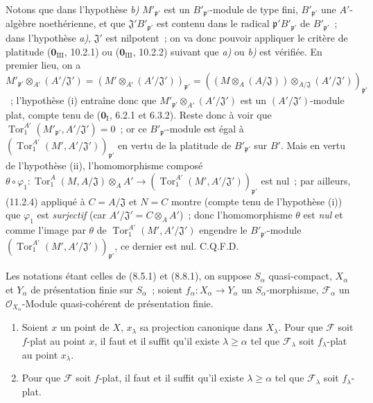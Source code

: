 Notons que dans l'hypothèse \emph{b)} $M'_{\mathfrak p'}$ est un
$B'_{\mathfrak p'}$-module de type fini, $B'_{\mathfrak p'}$ une
$A'$-algèbre noethérienne, et que $\mathfrak J'B'_{\mathfrak p'}$ est
contenu dans le radical $\mathfrak p'B'_{\mathfrak p'}$ de
$B'_{\mathfrak p'}$~; dans l'hypothèse \emph{a)}, $\mathfrak J'$ est nilpotent~;
on va donc pouvoir appliquer le critère de platitude
($\mathbf 0_{\mathrm{III}}$, 10.2.1) ou ($\mathbf 0_{\mathrm{III}}$, 10.2.2)
suivant que \emph{a)} ou \emph{b)} est vérifiée. En premier lieu, on a
$M'_{\mathfrak p'}\otimes_{A'}(A'/\mathfrak J')
=(M'\otimes_{A'}(A'/\mathfrak J'))_{\mathfrak p'}
=((M\otimes_A(A/\mathfrak J))\otimes_{A/\mathfrak J}
(A'/\mathfrak J'))_{\mathfrak p'}$~;
l'hypothèse (i) entraîne donc que
$M'_{\mathfrak p'}\otimes_{A'}(A'/\mathfrak J')$ est un
$(A'/\mathfrak J')$-module plat, compte tenu de
($\mathbf 0_{\mathrm I}$, 6.2.1 et 6.3.2). Reste donc à voir que
$\operatorname{Tor}_1^{A'}(M'_{\mathfrak p'},A'/\mathfrak J')=0$~; or ce
$B'_{\mathfrak p'}$-module est égal à
$(\operatorname{Tor}_1^{A'}(M',A'/\mathfrak J'))_{\mathfrak p'}$ en vertu
de la platitude de $B'_{\mathfrak p'}$ sur $B'$. Mais en vertu de
l'hypothèse (ii), l'homomorphisme composé
$\theta\circ\varphi_1:\operatorname{Tor}_1^A(M,A/\mathfrak J)\otimes_AA'
\to(\operatorname{Tor}_1^{A'}(M',A'/\mathfrak J'))_{\mathfrak p'}$ est
nul~; par ailleurs, (11.2.4) appliqué à $C=A/\mathfrak J$ et $N=C$ montre
(compte tenu de l'hypothèse (i)) que $\varphi_1$ est \emph{surjectif} (car
$A'/\mathfrak J'=C\otimes_AA'$)~; donc l'homomorphisme $\theta$ est
\emph{nul} et comme l'image par $\theta$ de
$\operatorname{Tor}_1^{A'}(M',A'/\mathfrak J')$ engendre le
$B'_{\mathfrak p'}$-module
$(\operatorname{Tor}_1^{A'}(M',A'/\mathfrak J'))_{\mathfrak p'}$, ce
dernier est nul. C.Q.F.D.

\begin{theorem}[11.2.6]
\label{IV.11.2.6-fr}
Les notations étant celles de (8.5.1) et (8.8.1), on suppose $S_\alpha$
quasi-compact, $X_\alpha$ et $Y_\alpha$ de présentation finie sur
$S_\alpha$~; soient $f_\alpha:X_\alpha\to Y_\alpha$ un
$S_\alpha$-morphisme, $\mathcal F_\alpha$ un
$\mathcal O_{X_\alpha}$-Module quasi-cohérent de présentation finie.


\begin{enumerate}[label=\emph{(\roman*)}]
\item Soient $x$ un point de $X$, $x_\lambda$ sa projection canonique dans
$X_\lambda$. Pour que $\mathcal F$ soit $f$-plat au point $x$, il faut et il
suffit qu'il existe $\lambda\geq\alpha$ tel que $\mathcal F_\lambda$ soit
$f_\lambda$-plat au point $x_\lambda$.
\item Pour que $\mathcal F$ soit $f$-plat, il faut et il suffit qu'il existe
$\lambda\geq\alpha$ tel que $\mathcal F_\lambda$ soit $f_\lambda$-plat.
\end{enumerate}
\end{theorem}

